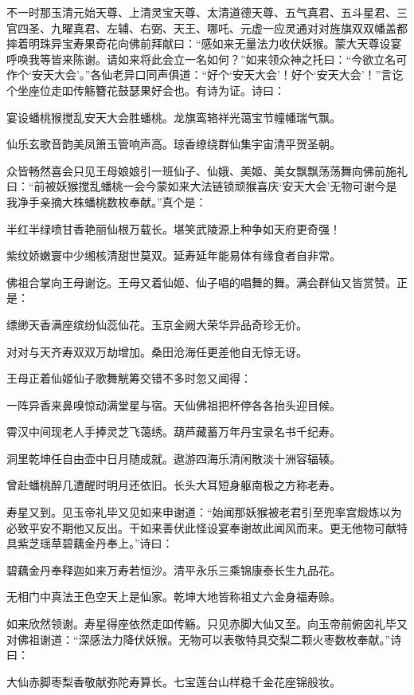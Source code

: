 \documentclass[12pt,UTF8]{ctexbook}
\begin{document}
{不一时那玉清元始天尊、上清灵宝天尊、太清道德天尊、五气真君、五斗星君、三官四圣、九曜真君、左辅、右弼、天王、哪吒、元虚一应灵通对对旌旗双双幡盖都摔着明珠异宝寿果奇花向佛前拜献曰：“感如来无量法力收伏妖猴。蒙大天尊设宴呼唤我等皆来陈谢。请如来将此会立一名如何？”如来领众神之托曰：“今欲立名可作个‘安天大会’。”各仙老异口同声俱道：“好个‘安天大会’！好个‘安天大会’！”言讫个坐座位走吅传觞簪花鼓瑟果好会也。有诗为证。诗曰：

宴设蟠桃猴搅乱安天大会胜蟠桃。龙旗鸾辂祥光蔼宝节幢幡瑞气飘。

仙乐玄歌音韵美凤箫玉管响声高。琼香缭绕群仙集宇宙清平贺圣朝。

众皆畅然喜会只见王母娘娘引一班仙子、仙娥、美姬、美女飘飘荡荡舞向佛前施礼曰：“前被妖猴搅乱蟠桃一会今蒙如来大法链锁顽猴喜庆‘安天大会’无物可谢今是我净手亲摘大株蟠桃数枚奉献。”真个是：

半红半绿喷甘香艳丽仙根万载长。堪笑武陵源上种争如天府更奇强！

紫纹娇嫩寰中少缃核清甜世莫双。延寿延年能易体有缘食者自非常。

佛祖合掌向王母谢讫。王母又着仙姬、仙子唱的唱舞的舞。满会群仙又皆赏赞。正是：

缥缈天香满座缤纷仙蕊仙花。玉京金阙大荣华异品奇珍无价。

对对与天齐寿双双万劫增加。桑田沧海任更差他自无惊无讶。

王母正着仙姬仙子歌舞觥筹交错不多时忽又闻得：

一阵异香来鼻嗅惊动满堂星与宿。天仙佛祖把杯停各各抬头迎目候。

霄汉中间现老人手捧灵芝飞蔼绣。葫芦藏蓄万年丹宝录名书千纪寿。

洞里乾坤任自由壶中日月随成就。遨游四海乐清闲散淡十洲容辐辏。

曾赴蟠桃醉几遭醒时明月还依旧。长头大耳短身躯南极之方称老寿。

寿星又到。见玉帝礼毕又见如来申谢道：“始闻那妖猴被老君引至兜率宫煅炼以为必致平安不期他又反出。干如来善伏此怪设宴奉谢故此闻风而来。更无他物可献特具紫芝瑶草碧藕金丹奉上。”诗曰：

碧藕金丹奉释迦如来万寿若恒沙。清平永乐三乘锦康泰长生九品花。

无相门中真法王色空天上是仙家。乾坤大地皆称祖丈六金身福寿赊。

如来欣然领谢。寿星得座依然走吅传觞。只见赤脚大仙又至。向玉帝前俯囟礼毕又对佛祖谢道：“深感法力降伏妖猴。无物可以表敬特具交梨二颗火枣数枚奉献。”诗曰：

大仙赤脚枣梨香敬献弥陀寿算长。七宝莲台山样稳千金花座锦般妆。

}
\end{document}
